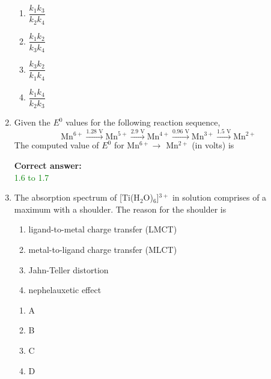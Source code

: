 \documentclass[journal,12pt,onecolumn]{exam}
\theoremstyle{remark}
\newcommand{\correct}{\textcolor{correctgreen}{\checkmark}}
\newcommand{\wrong}{\textcolor{wrongred}{\ding{55}}} %
\begin{document}
\begin{enumerate}
 

\begin{multicols}{2}
\begin{enumerate}
    \item \textcolor{green}{\checkmark} $\dfrac{k_1 k_3}{k_2 k_4}$
    \item \textcolor{red}{} $\dfrac{k_1 k_2}{k_3 k_4}$
    \item \textcolor{red}{} $\dfrac{k_3 k_2}{k_1 k_4}$
    \item \textcolor{red}{} $\dfrac{k_1 k_4}{k_2 k_3}$
\end{enumerate}
\end{multicols}

 

\item

Given the $E^0$ values for the following reaction sequence,
\[
\text{Mn}^{6+} \xrightarrow{1.28\text{ V}} \text{Mn}^{5+} \xrightarrow{2.9\text{ V}} \text{Mn}^{4+} \xrightarrow{0.96\text{ V}} \text{Mn}^{3+} \xrightarrow{1.5\text{ V}} \text{Mn}^{2+}
\]
The computed value of $E^0$ for Mn$^{6+} \rightarrow$ Mn$^{2+}$ (in volts) is \underline{\hspace{3cm}}

\hfill{}
 

\textbf{Correct answer:} \\
\textcolor{green}{1.6 to 1.7}

 

\item
The absorption spectrum of [Ti(H$_2$O)$_6$]$^{3+}$ in solution comprises of a maximum with a shoulder. The reason for the shoulder is

\begin{enumerate}
    \item ligand-to-metal charge transfer (LMCT)
    \item metal-to-ligand charge transfer (MLCT)
    \item Jahn-Teller distortion
    \item nephelauxetic effect
\end{enumerate}

\hfill{}

 

\begin{multicols}{2}
\begin{enumerate}
    \item \wrong A
    \item \wrong B
    \item \correct C
    \item \wrong D
\end{enumerate}
\end{multicols}


\end{enumerate}
\end{document}

